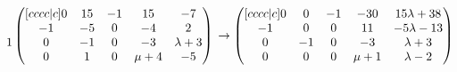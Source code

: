 \documentclass{article}
\begin{document}
\begin{math}
\begin{matrix}
          ~\\
          1
        \end{matrix}
        \begin{pmatrix}[cccc|c]
             0 & 15 & -1 & 15 & -7\\
             -1 & -5 & 0 & -4 & 2\\
             0 & -1 & 0 & -3 & \lambda + 3\\
             0 & 1 & 0 & \mu + 4 & -5
        \end{pmatrix}\\
        \\
        \\
        \to
        \begin{pmatrix}[cccc|c]
             0 & 0 & -1 & -30 & 15\lambda + 38\\
             -1 & 0 & 0 & 11 & -5\lambda - 13\\
             0 & -1 & 0 & -3 & \lambda + 3\\
             0 & 0 & 0 & \mu + 1 & \lambda - 2
        \end{pmatrix}
    \end{math}
\end{document}
